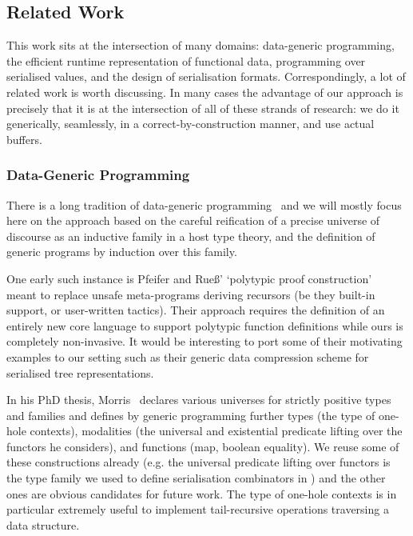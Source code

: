 \subsection{Related Work}

This work sits at the intersection of many domains:
data-generic programming,
the efficient runtime representation of functional data,
programming over serialised values,
and the design of serialisation formats.
%
Correspondingly, a lot of related work is worth discussing.
In many cases the advantage of our approach is precisely that it is
at the intersection of all of these strands of research:
we do it generically, seamlessly, in a correct-by-construction manner,
and use actual buffers.

\subsubsection{Data-Generic Programming}

There is a long tradition of data-generic
programming~\citep{DBLP:conf/ssdgp/Gibbons06} and we will mostly focus here
on the approach based on the careful reification of a precise universe of
discourse as an inductive family in a host type theory,
and the definition of generic programs by induction over this family.

One early such instance is Pfeifer and Rue{\ss}'
`polytypic proof construction'~\citeyearpar{DBLP:conf/tphol/PfeiferR99}
meant to replace unsafe meta-programs deriving recursors
(be they built-in support, or user-written tactics).
%
Their approach requires the definition of an entirely new core language
to support polytypic function definitions while ours is completely
non-invasive.
%
It would be interesting to port some of their motivating examples to our
setting such as their generic data compression scheme for serialised
tree representations.

In his PhD thesis, Morris~\citeyearpar{DBLP:phd/ethos/Morris07} declares
various universes for strictly positive types and families and defines by
generic programming further types (the type of one-hole contexts),
modalities (the universal and existential predicate lifting over the functors
he considers), and functions (map, boolean equality).
%
We reuse some of these constructions already (e.g. the universal predicate
lifting over functors is the  type family we used to define
serialisation combinators in ) and the other ones are
obvious candidates for future work.
%
The type of one-hole contexts is in particular extremely useful to implement
tail-recursive operations traversing a data structure.

